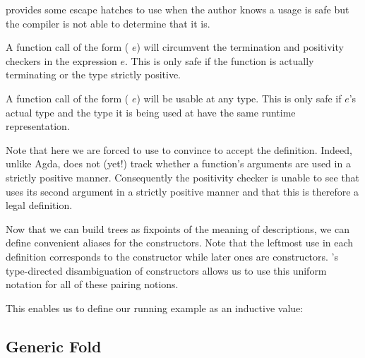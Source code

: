 
\begin{remark}
  \idris provides some escape hatches to use when the author
  knows a usage is safe but the compiler is not able to
  determine that it is.

  A function call of the form (\assertTotal{} $e$) will
  circumvent the termination and positivity checkers in
  the expression $e$.
  This is only safe if the function is actually terminating
  or the type strictly positive.

  A function call of the form (\believeMe{} $e$) will be
  usable at any type. This is only safe if $e$'s actual type
  and the type it is being used at have the same runtime
  representation.
\end{remark}

Note that here we are forced to use \assertTotal{} to convince \idris{}
to accept the definition.
%
Indeed, unlike Agda, \idris{} does not (yet!) track whether a function's
arguments are used in a strictly positive manner.
%
Consequently the positivity checker
is unable to see that  uses its second
argument in a strictly positive manner
and that this is therefore a legal definition.

Now that we can build trees as fixpoints of the
meaning of descriptions, we can define convenient aliases for
the  constructors.
%
Note that the leftmost \IdrisData{(\#)} use in each definition corresponds
to the  constructor while later ones are 
constructors.
%
\idris{}'s type-directed disambiguation of constructors allows us to use
this uniform notation for all of these pairing notions.

\noindent
\begin{minipage}[t]{.3\textwidth}
\end{minipage}\hfill
\begin{minipage}[t]{.65\textwidth}
\end{minipage}

This enables us to define our running example as an inductive value:


\subsection{Generic Fold}\label{sec:genericfoldinductive}

